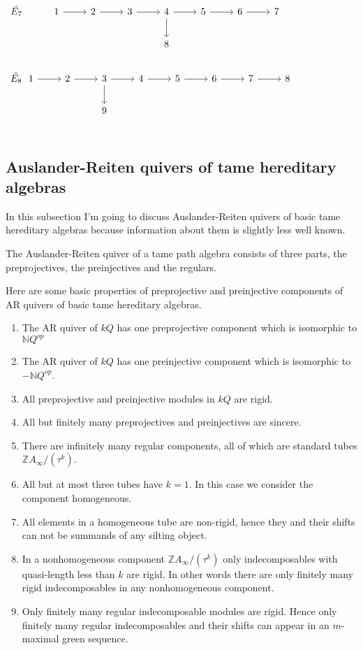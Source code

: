 $\begin{tikzcd}
\tilde{E_7}& 1\arrow[r] & 2\arrow[r] & 3\arrow[r]& 4\arrow[r]\arrow[d]  & 5\arrow[r] & 6\arrow[r] & 7\\
&		&		   &  		     & 	8		      & 		& 		&\\
\end{tikzcd}$\\
$\begin{tikzcd}
\tilde{E_8}\,\,\,\, 1\arrow[r] & 2\arrow[r] & 3\arrow[r]\arrow[d] & 4\arrow[r] & 5\arrow[r] & 6\arrow[r] & 7\arrow[r] & 8\\
	&		&  			9& 			& & & &\\
\end{tikzcd}$
\subsection{Auslander-Reiten quivers of tame hereditary algebras}
\indent In this subsection I'm going to discuss Auslander-Reiten quivers of basic tame hereditary algebras because information about them is slightly less well known.\\
\begin{theorem}
\indent The Auslander-Reiten quiver of a tame path algebra consists of three parts, the preprojectives, the preinjectives and the regulars.
\end{theorem}
\indent Here are some basic properties of preprojective and preinjective components of AR quivers of basic tame hereditary algebras.
\begin{theorem}
\begin{enumerate}
\item The AR quiver of $kQ$ has one preprojective component which is isomorphic to $\mathbb{N}Q^{op}$
\item The AR quiver of $kQ$ has one preinjective component which is isomorphic to $-\mathbb{N}Q^{op}$.
\item All preprojective and preinjective modules in $kQ$ are rigid.
\item All but finitely many preprojectives and preinjectives are sincere.
\item There are infinitely many regular components, all of which are standard tubes $\mathbb{Z}A_{\infty}/(\tau^k)$.
\item All but at most three tubes have $k=1$. In this case we consider the component homogeneous.
\item All elements in a homogeneous tube are non-rigid, hence they and their shifts can not be summands of any silting object.
\item In a nonhomogeneous component $\mathbb{Z}A_{\infty}/(\tau^k)$ only indecomposables with quasi-length less than $k$ are rigid. In other words there are only finitely many rigid indecomposables in any nonhomogeneous component.
\item Only finitely many regular indecomposable modules are rigid. Hence only finitely many regular indecomposables and their shifts can appear in an $m$-maximal green sequence.
\end{enumerate}
\end{theorem}
